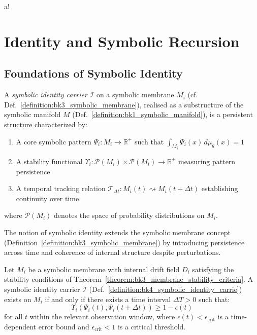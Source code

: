 ﻿a!\section{Identity and Symbolic Recursion}
\label{sec:bk4_identity_and_symbolic_recursion}
\subsection{Foundations of Symbolic Identity} \label{subsec:bk4_foundations_symbolic_identity}
\begin{definition}
\label{definition:bk4_symbolic_identity_carrie}
A \emph{symbolic identity carrier} $\mathcal{I}$ on a symbolic membrane $M_i$ (cf. Def.~\ref{definition:bk3_symbolic_membrane}), realised as a substructure of the symbolic manifold $M$ (Def.~\ref{definition:bk1_symbolic_manifold}), is a persistent structure characterized by:
\begin{enumerate}
    \item A core symbolic pattern $\Psi_i : M_i \to \mathbb{R}^+$ such that $\int_{M_i} \Psi_i(x)\, d\mu_g(x) = 1$
    \item A stability functional $\Upsilon_i : \mathcal{P}(M_i) \times \mathcal{P}(M_i) \to \mathbb{R}^+$ measuring pattern persistence
    \item A temporal tracking relation $\mathcal{T}_{\Delta t} : M_i(t) \rightsquigarrow M_i(t+\Delta t)$ establishing continuity over time
\end{enumerate}
where $\mathcal{P}(M_i)$ denotes the space of probability distributions on $M_i$.
\end{definition}
The notion of symbolic identity extends the symbolic membrane concept (Definition~\ref{definition:bk3_symbolic_membrane}) by introducing persistence across time and coherence of internal structure despite perturbations.
\begin{theorem}
\label{theorem:bk4_existence_of_symbolic_ident}
Let $M_i$ be a symbolic membrane with internal drift field $D_i$ satisfying the stability conditions of Theorem~\ref{theorem:bk3_membrane_stability_criteria}. A symbolic identity carrier $\mathcal{I}$ (Def.~\ref{definition:bk4_symbolic_identity_carrie}) exists on $M_i$ if and only if there exists a time interval $\Delta T > 0$ such that:
\begin{equation} \label{eq:bk4_mutual_info_expansion_entropy}
\Upsilon_i(\Psi_i(t), \Psi_i(t+\Delta t)) \geq 1 - \epsilon(t)
\end{equation}
for all $t$ within the relevant observation window, where $\epsilon(t) < \epsilon_{\text{crit}}$ is a time-dependent error bound and $\epsilon_{\text{crit}} < 1$ is a critical threshold.
\end{theorem}
